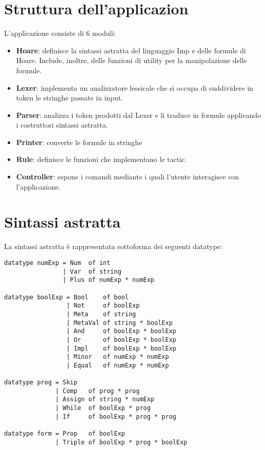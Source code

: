 \documentclass[]{article}
\begin{document}
\section{Struttura dell'applicazion}
L'applicazione consiste di 6 moduli:
\begin{itemize}
	\item \textbf{Hoare}:
definisce la sintassi astratta del linguaggio Imp e delle formule di Hoare.  Include, inoltre, delle funzioni di utility per la manipolazione delle formule.
    \item \textbf{Lexer}:
    implementa un analizzatore lessicale che si occupa di suddividere in token le stringhe passate in input.
    \item \textbf{Parser}:
    analizza i token prodotti dal Lexer e li traduce in formule applicando i costruttori sintassi astratta.
    \item \textbf{Printer}:
    converte le formule in stringhe
    \item \textbf{Rule}: definisce le funzioni che implementano le tactic.
    \item \textbf{Controller}: espone i comandi mediante i quali l'utente interagisce con l'applicazione.
\end{itemize}

\section{Sintassi astratta}
La sintassi astratta \`e rappresentata sottoforma dei seguenti datatype:

\begin{center}
\begin{BVerbatim}
datatype numExp = Num  of int
                | Var  of string
                | Plus of numExp * numExp

datatype boolExp = Bool    of bool
                 | Not     of boolExp
                 | Meta    of string
                 | MetaVal of string * boolExp
                 | And     of boolExp * boolExp
                 | Or      of boolExp * boolExp
                 | Impl    of boolExp * boolExp
                 | Minor   of numExp * numExp
                 | Equal   of numExp * numExp

datatype prog = Skip
              | Comp   of prog * prog
              | Assign of string * numExp
              | While  of boolExp * prog
              | If     of boolExp * prog * prog

datatype form = Prop   of boolExp
              | Triple of boolExp * prog * boolExp
\end{BVerbatim}
\end{center}
\end{document}
